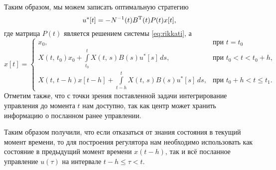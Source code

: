 Таким образом, мы можем записать оптимальную стратегию
\begin{equation} \label{eq:opt_control}
u^*[t] = -N^{-1}(t)B^\mathrm{T}(t) P(t)x[t],
\end{equation}
где матрица $P(t)$ является решением системы \eqref{eq:rikkati}, а 
\begin{equation*}
x[t] =
\begin{cases}
x_0,&\mbox{при }t = t_0\\
X(t,\,t_0)x_0 + \int\limits_{t_0}^{t}X(t,\,s)B(s)u^*[s]\,ds,
&\mbox{при }t_0 < t < t_0 + h,\\
X(t,\,t - h)x[t-h] + \int\limits_{t - h}^{t}X(t,\,s)B(s)u^*[s]\,ds,
&\mbox{при } t_0 + h < t \leqslant t_1.
\end{cases}
\end{equation*}
Отметим также, что с точки зрения поставленной задачи интегрирование управления до момента $t$ нам доступно, так как центр может хранить информацию о посланном ранее управлении.

Таким образом получили, что если отказаться от знания состояния в текущий момент времени, то для построения регулятора нам необходимо использовать как состояние в предыдущий момент времени $x(t - h)$, так и всё посланное управление $u(\tau)$ на интервале $t - h \leqslant \tau < t$.